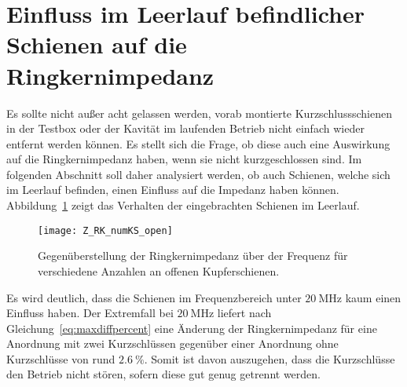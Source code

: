 \section{Einfluss im Leerlauf befindlicher Schienen auf die Ringkernimpedanz}
Es sollte nicht au\ss{}er acht gelassen werden, vorab montierte Kurzschlussschienen in der Testbox oder der Kavit\"at im laufenden Betrieb nicht einfach wieder entfernt werden k\"onnen. Es stellt sich die Frage, ob diese auch eine Auswirkung auf die Ringkernimpedanz haben, wenn sie nicht kurzgeschlossen sind. Im folgenden Abschnitt soll daher analysiert werden, ob auch Schienen, welche sich im Leerlauf befinden, einen Einfluss auf die Impedanz haben k\"onnen. Abbildung~\ref{fig:openksnumber} zeigt das Verhalten der eingebrachten Schienen im Leerlauf.
\begin{figure}[htb]
	\centering
	\texttt{[image: Z\_RK\_numKS\_open]}
	\caption{Gegen\"uberstellung der Ringkernimpedanz \"uber der Frequenz f\"ur verschiedene Anzahlen an offenen Kupferschienen.}
	\label{fig:openksnumber}
\end{figure}
\par
Es wird deutlich, dass die Schienen im Frequenzbereich unter $\SI{20}{\mega\hertz}$ kaum einen Einfluss haben. Der Extremfall bei $\SI{20}{\mega\hertz}$ liefert nach Gleichung~\ref{eq:maxdiffpercent} eine \"Anderung der Ringkernimpedanz f\"ur eine Anordnung mit zwei Kurzschl\"ussen gegen\"uber einer Anordnung ohne Kurzschl\"usse von rund $\SI{2,6}{\%}$. Somit ist davon auszugehen, dass die Kurzschl\"usse den Betrieb nicht st\"oren, sofern diese gut genug getrennt werden.